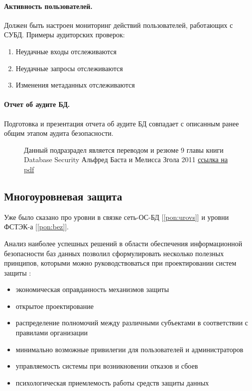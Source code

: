 \paragraph{Активность пользователей.}

Должен быть настроен мониторинг действий пользователей, работающих с СУБД. Примеры аудиторских проверок:

\begin{enumerate}
	\item Неудачные входы отслеживаются
	\item Неудачные запросы отслеживаются
	\item Изменения метаданных отслеживаются
\end{enumerate}

\paragraph{Отчет об аудите БД.}

Подготовка и презентация отчета об аудите БД совпадает с описанным ранее общим этапом аудита безопасности.

\begin{figure}[b]
Данный подразрадел является переводом и резюме 9 главы книги Database Security Альфред Баста и Мелисса Згола 2011 \href{https://pdfcoffee.com/alfred-basta-melissa-zgola-database-security-cengage-learning-2011-pdf-pdf-free.html}{ссылка на pdf}
\end{figure}

\clearpage

\subsection{Многоуровневая защита}
Уже было сказано про уровни в связке сеть-ОС-БД [\ref{pon:urovs}] и уровни ФСТЭК-а [\ref{pon:bez}].

Анализ наиболее успешных решений в области обеспе­чения информационной безопасности баз данных позволил сформулировать несколько полезных принципов, которыми можно руководствоваться при проектировании систем защиты \autocite{Smirnov2007}:
\begin{itemize}
	\item экономическая оправданность механизмов защиты
	\item открытое проектирование
	\item распределение полномочий между различными субъектами в соответствии с правилами организации
	\item минимально возможные привилегии для пользователей и администраторов
	\item управляемость системы при возникновении отказов и сбоев
	\item психологическая приемлемость работы средств защиты данных
\end{itemize}

